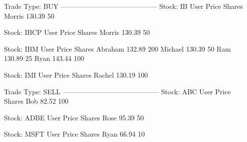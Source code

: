 
Trade Type: BUY 
------------------------------------------ 
Stock: IB 
User     	 Price    	 Shares   
Morris   	 130.39 	 50

Stock: IBCP 
User     	 Price    	 Shares   
Morris   	 130.39 	 50

Stock: IBM 
User     	 Price    	 Shares   
Abraham  	 132.89 	 200
Michael  	 130.39 	 50
Ram      	 130.89 	 25
Ryan     	 143.44 	 100

Stock: IMI 
User     	 Price    	 Shares   
Rachel   	 130.19 	 100

Trade Type: SELL 
------------------------------------------ 
Stock: ABC 
User     	 Price    	 Shares   
Bob      	 82.52 	 100

Stock: ADBE 
User     	 Price    	 Shares   
Rose     	 95.39 	 50

Stock: MSFT 
User     	 Price    	 Shares   
Ryan     	 66.94 	 10
